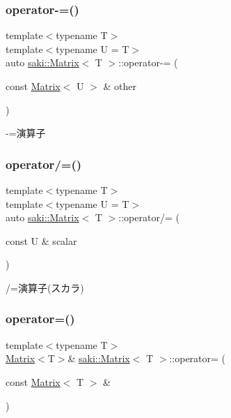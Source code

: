 \subsubsection{\texorpdfstring{operator-\/=()}{operator-=()}}
{\footnotesize\ttfamily template$<$typename T$>$ \\
template$<$typename U  = T$>$ \\
auto \mbox{\hyperlink{classsaki_1_1_matrix}{saki\+::\+Matrix}}$<$ T $>$\+::operator-\/= (\begin{DoxyParamCaption}\item[{const \mbox{\hyperlink{classsaki_1_1_matrix}{Matrix}}$<$ U $>$ \&}]{other }\end{DoxyParamCaption})\hspace{0.3cm}{\ttfamily [inline]}}



-\/=演算子 

\mbox{\label{classsaki_1_1_matrix_a12f386d5595d02c11a8a7af642183c6c}} 
\subsubsection{\texorpdfstring{operator/=()}{operator/=()}}
{\footnotesize\ttfamily template$<$typename T$>$ \\
template$<$typename U  = T$>$ \\
auto \mbox{\hyperlink{classsaki_1_1_matrix}{saki\+::\+Matrix}}$<$ T $>$\+::operator/= (\begin{DoxyParamCaption}\item[{const U \&}]{scalar }\end{DoxyParamCaption})\hspace{0.3cm}{\ttfamily [inline]}}



/=演算子(スカラ) 

\mbox{\label{classsaki_1_1_matrix_af83ebe0a4f4652fbf30dd64307021603}} 
\subsubsection{\texorpdfstring{operator=()}{operator=()}\hspace{0.1cm}{\footnotesize\ttfamily [1/2]}}
{\footnotesize\ttfamily template$<$typename T$>$ \\
\mbox{\hyperlink{classsaki_1_1_matrix}{Matrix}}$<$T$>$\& \mbox{\hyperlink{classsaki_1_1_matrix}{saki\+::\+Matrix}}$<$ T $>$\+::operator= (\begin{DoxyParamCaption}\item[{const \mbox{\hyperlink{classsaki_1_1_matrix}{Matrix}}$<$ T $>$ \&}]{ }\end{DoxyParamCaption})\hspace{0.3cm}{\ttfamily [default]}}

